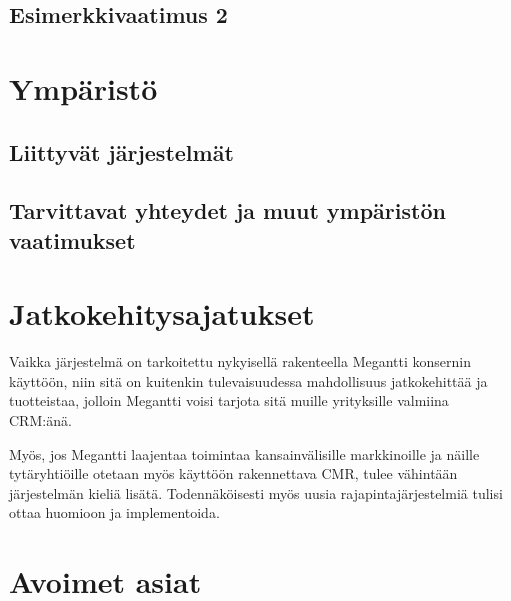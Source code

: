     \subsection{Esimerkkivaatimus 2}





\section{Ympäristö}     %
    \subsection{Liittyvät järjestelmät}     %


    \subsection{Tarvittavat yhteydet ja muut ympäristön vaatimukset}  %


\section{Jatkokehitysajatukset}     %

    Vaikka järjestelmä on tarkoitettu nykyisellä rakenteella Megantti konsernin käyttöön, niin sitä on kuitenkin tulevaisuudessa
    mahdollisuus jatkokehittää ja tuotteistaa, jolloin Megantti voisi tarjota sitä muille yrityksille valmiina CRM:änä.

    Myös, jos Megantti laajentaa toimintaa kansainvälisille markkinoille ja näille tytäryhtiöille otetaan myös käyttöön rakennettava
    CMR, tulee vähintään järjestelmän kieliä lisätä. Todennäköisesti myös uusia rajapintajärjestelmiä tulisi ottaa huomioon ja implementoida.


\section{Avoimet asiat}     %



   
